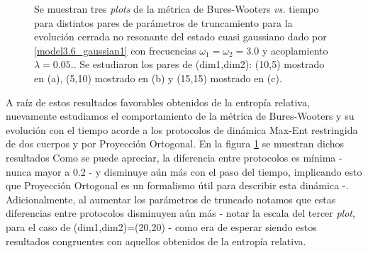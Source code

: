 \documentclass{report} %
\numberwithin{equation}{section}
\begin{document}
\begin{figure}
\caption{Se muestran tres \textit{plots} de la métrica de Bures-Wooters \textit{vs.} tiempo para distintos pares de parámetros de truncamiento para la evolución cerrada no resonante del estado cuasi gaussiano dado por \eqref{model3.6_gaussian1} con frecuencias $\omega_1 = \omega_2 = 3.0$ y acoplamiento $\lambda = 0.05$.. Se estudiaron los pares de (dim1,dim2): (10,5) mostrado en (a), (5,10) mostrado en (b) y (15,15) mostrado en (c). }
\label{bxb-closed-res/bxb_closed_r.png}
\end{figure}

A raíz de estos resultados favorables obtenidos de la entropía relativa, nuevamente estudiamos el comportamiento de la métrica de Bures-Wooters y su evolución con el tiempo acorde a los protocolos de dinámica Max-Ent restringida de dos cuerpos y por Proyección Ortogonal. En la figura \ref{bxb-closed-res/bxb_closed_r.png} se muestran dichos resultados Como se puede apreciar, la diferencia entre protocolos es mínima - nunca mayor a $0.2$ - y disminuye aún más con el paso del tiempo, implicando esto que Proyección Ortogonal es un formalismo útil para describir esta dinámica -. Adicionalmente, al aumentar los parámetros de truncado notamos que estas diferencias entre protocolos disminuyen aún más - notar la escala del tercer \textit{plot}, para el caso de (dim1,dim2)=(20,20) - como era de esperar siendo estos resultados congruentes con aquellos obtenidos de la entropía relativa.
\end{document}
